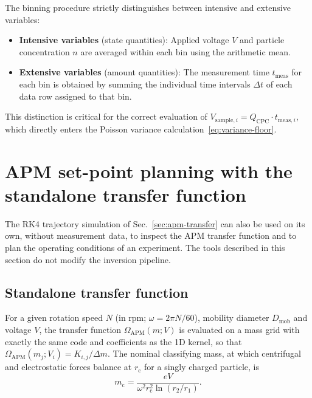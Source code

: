 \documentclass[11pt,a4paper]{article}
\begin{document}
The binning procedure strictly distinguishes between intensive and extensive
variables:
\begin{itemize}
  \item \textbf{Intensive variables} (state quantities): Applied voltage $V$
    and particle concentration $n$ are averaged within each bin using the
    arithmetic mean.
  \item \textbf{Extensive variables} (amount quantities): The measurement time
    $t_{\mathrm{meas}}$ for each bin is obtained by summing the individual
    time intervals $\Delta t$ of each data row assigned to that bin.
\end{itemize}

This distinction is critical for the correct evaluation of
$V_{\mathrm{sample},i} = Q_{\mathrm{CPC}} \cdot t_{\mathrm{meas},i}$, which
directly enters the Poisson variance calculation~\eqref{eq:variance-floor}.

\section{APM set-point planning with the standalone transfer function}
\label{sec:setpoint}

The RK4 trajectory simulation of Sec.~\ref{sec:apm-transfer} can also be
used on its own, without measurement data, to inspect the APM transfer
function and to plan the operating conditions of an experiment. The tools
described in this section do not modify the inversion pipeline.

\subsection{Standalone transfer function}
\label{sec:standalone-tf}

For a given rotation speed $N$ (in rpm; $\omega = 2\pi N/60$), mobility
diameter $D_{\mathrm{mob}}$ and voltage $V$, the transfer function
$\Omega_{\mathrm{APM}}(m; V)$ is evaluated on a mass grid with exactly the
same code and coefficients as the 1D kernel, so that
$\Omega_{\mathrm{APM}}(m_{j}; V_{i}) = K_{i,j}/\Delta m$. The nominal
classifying mass, at which centrifugal and electrostatic forces balance at
$r_{\mathrm{c}}$ for a singly charged particle, is
\begin{equation}
  m_{\mathrm{c}} = \frac{eV}{\omega^{2} r_{\mathrm{c}}^{2} \ln(r_{2}/r_{1})}.
  \label{eq:classifying-mass}
\end{equation}
\end{document}
